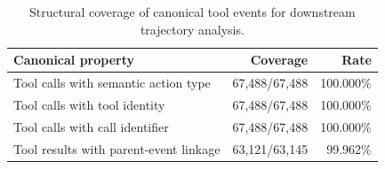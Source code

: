 \begin{table}[t]
\centering
\small
\begin{tabular}{lrr}
\toprule
Canonical property & Coverage & Rate \\
\midrule
Tool calls with semantic action type & 67,488/67,488 & 100.000\% \\
Tool calls with tool identity & 67,488/67,488 & 100.000\% \\
Tool calls with call identifier & 67,488/67,488 & 100.000\% \\
Tool results with parent-event linkage & 63,121/63,145 & 99.962\% \\
\bottomrule
\end{tabular}
\caption{Structural coverage of canonical tool events for downstream trajectory analysis.}
\label{tab:structural_coverage}
\end{table}
